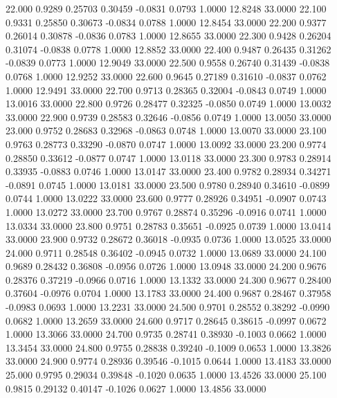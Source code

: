   22.000   0.9289   0.25703   0.30459  -0.0831   0.0793   1.0000  12.8248  33.0000
  22.100   0.9331   0.25850   0.30673  -0.0834   0.0788   1.0000  12.8454  33.0000
  22.200   0.9377   0.26014   0.30878  -0.0836   0.0783   1.0000  12.8655  33.0000
  22.300   0.9428   0.26204   0.31074  -0.0838   0.0778   1.0000  12.8852  33.0000
  22.400   0.9487   0.26435   0.31262  -0.0839   0.0773   1.0000  12.9049  33.0000
  22.500   0.9558   0.26740   0.31439  -0.0838   0.0768   1.0000  12.9252  33.0000
  22.600   0.9645   0.27189   0.31610  -0.0837   0.0762   1.0000  12.9491  33.0000
  22.700   0.9713   0.28365   0.32004  -0.0843   0.0749   1.0000  13.0016  33.0000
  22.800   0.9726   0.28477   0.32325  -0.0850   0.0749   1.0000  13.0032  33.0000
  22.900   0.9739   0.28583   0.32646  -0.0856   0.0749   1.0000  13.0050  33.0000
  23.000   0.9752   0.28683   0.32968  -0.0863   0.0748   1.0000  13.0070  33.0000
  23.100   0.9763   0.28773   0.33290  -0.0870   0.0747   1.0000  13.0092  33.0000
  23.200   0.9774   0.28850   0.33612  -0.0877   0.0747   1.0000  13.0118  33.0000
  23.300   0.9783   0.28914   0.33935  -0.0883   0.0746   1.0000  13.0147  33.0000
  23.400   0.9782   0.28934   0.34271  -0.0891   0.0745   1.0000  13.0181  33.0000
  23.500   0.9780   0.28940   0.34610  -0.0899   0.0744   1.0000  13.0222  33.0000
  23.600   0.9777   0.28926   0.34951  -0.0907   0.0743   1.0000  13.0272  33.0000
  23.700   0.9767   0.28874   0.35296  -0.0916   0.0741   1.0000  13.0334  33.0000
  23.800   0.9751   0.28783   0.35651  -0.0925   0.0739   1.0000  13.0414  33.0000
  23.900   0.9732   0.28672   0.36018  -0.0935   0.0736   1.0000  13.0525  33.0000
  24.000   0.9711   0.28548   0.36402  -0.0945   0.0732   1.0000  13.0689  33.0000
  24.100   0.9689   0.28432   0.36808  -0.0956   0.0726   1.0000  13.0948  33.0000
  24.200   0.9676   0.28376   0.37219  -0.0966   0.0716   1.0000  13.1332  33.0000
  24.300   0.9677   0.28400   0.37604  -0.0976   0.0704   1.0000  13.1783  33.0000
  24.400   0.9687   0.28467   0.37958  -0.0983   0.0693   1.0000  13.2231  33.0000
  24.500   0.9701   0.28552   0.38292  -0.0990   0.0682   1.0000  13.2659  33.0000
  24.600   0.9717   0.28645   0.38615  -0.0997   0.0672   1.0000  13.3066  33.0000
  24.700   0.9735   0.28741   0.38930  -0.1003   0.0662   1.0000  13.3454  33.0000
  24.800   0.9755   0.28838   0.39240  -0.1009   0.0653   1.0000  13.3826  33.0000
  24.900   0.9774   0.28936   0.39546  -0.1015   0.0644   1.0000  13.4183  33.0000
  25.000   0.9795   0.29034   0.39848  -0.1020   0.0635   1.0000  13.4526  33.0000
  25.100   0.9815   0.29132   0.40147  -0.1026   0.0627   1.0000  13.4856  33.0000
